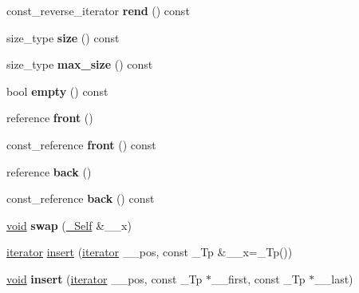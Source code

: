 \begin{DoxyCompactItemize}
\item 
\mbox{\label{classlist_acbc05d64e00f25eef983c0d9d80d1ee7}} 
const\+\_\+reverse\+\_\+iterator {\bfseries rend} () const
\item 
\mbox{\label{classlist_a877231dc8a378d0480791a2e7b475950}} 
size\+\_\+type {\bfseries size} () const
\item 
\mbox{\label{classlist_ac23562cfa1fff0e097be9499f7454907}} 
size\+\_\+type {\bfseries max\+\_\+size} () const
\item 
\mbox{\label{classlist_ae7fc0477afca961a473c44214510731b}} 
bool {\bfseries empty} () const
\item 
\mbox{\label{classlist_ae17efa5f51e4cfbfa875347f237af9af}} 
reference {\bfseries front} ()
\item 
\mbox{\label{classlist_a18ffb45b1c4d292a21bf7b9c4066b087}} 
const\+\_\+reference {\bfseries front} () const
\item 
\mbox{\label{classlist_a0f81365b027e9f32e0a987c176f0ad3c}} 
reference {\bfseries back} ()
\item 
\mbox{\label{classlist_a1846831a069a25a9a45d6b9e38f971d6}} 
const\+\_\+reference {\bfseries back} () const
\item 
\mbox{\label{classlist_a5d70b1952414c6bc2f1ae45748e28502}} 
\hyperlink{interfacevoid}{void} {\bfseries swap} (\hyperlink{classlist}{\+\_\+\+Self} \&\+\_\+\+\_\+x)
\item 
\hyperlink{structiterator}{iterator} \hyperlink{classlist_a3352f72c4bf2bef4a8c60f09cfe94aea}{insert} (\hyperlink{structiterator}{iterator} \+\_\+\+\_\+pos, const \+\_\+\+Tp \&\+\_\+\+\_\+x=\+\_\+\+Tp())
\item 
\mbox{\label{classlist_ab580ff4234456ec013480cbe7ce4c8f5}} 
\hyperlink{interfacevoid}{void} {\bfseries insert} (\hyperlink{structiterator}{iterator} \+\_\+\+\_\+pos, const \+\_\+\+Tp $\ast$\+\_\+\+\_\+first, const \+\_\+\+Tp $\ast$\+\_\+\+\_\+last)
\item 
\mbox{\label{classlist_adf9c0573fd7755249cdef99c9ff75377}} 

\end{DoxyCompactItemize}

